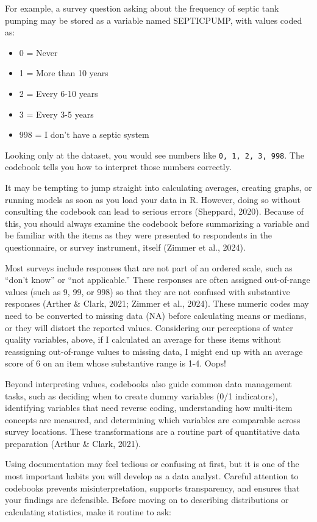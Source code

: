 \documentclass[
  letterpaper,
  DIV=11,
  numbers=noendperiod]{scrreprt}
\providecommand{\tightlist}{%
  \setlength{\itemsep}{0pt}\setlength{\parskip}{0pt}}
\begin{document}
For example, a survey question asking about the frequency of septic tank
pumping may be stored as a variable named SEPTICPUMP, with values coded
as:

\begin{itemize}
\tightlist
\item
  0 = Never
\item
  1 = More than 10 years
\item
  2 = Every 6-10 years
\item
  3 = Every 3-5 years
\item
  998 = I don't have a septic system
\end{itemize}

Looking only at the dataset, you would see numbers like
\texttt{0,\ 1,\ 2,\ 3,\ 998}. The codebook tells you how to interpret
those numbers correctly.

It may be tempting to jump straight into calculating averages, creating
graphs, or running models as soon as you load your data in R. However,
doing so without consulting the codebook can lead to serious errors
(Sheppard, 2020). Because of this, you should always examine the
codebook before summarizing a variable and be familiar with the items as
they were presented to respondents in the questionnaire, or survey
instrument, itself (Zimmer et al., 2024).

Most surveys include responses that are not part of an ordered scale,
such as ``don't know'' or ``not applicable.'' These responses are often
assigned out-of-range values (such as 9, 99, or 998) so that they are
not confused with substantive responses (Arther \& Clark, 2021; Zimmer
et al., 2024). These numeric codes may need to be converted to missing
data (NA) before calculating means or medians, or they will distort the
reported values. Considering our perceptions of water quality variables,
above, if I calculated an average for these items without reassigning
out-of-range values to missing data, I might end up with an average
score of 6 on an item whose substantive range is 1-4. Oops!

Beyond interpreting values, codebooks also guide common data management
tasks, such as deciding when to create dummy variables (0/1 indicators),
identifying variables that need reverse coding, understanding how
multi-item concepts are measured, and determining which variables are
comparable across survey locations. These transformations are a routine
part of quantitative data preparation (Arthur \& Clark, 2021).

Using documentation may feel tedious or confusing at first, but it is
one of the most important habits you will develop as a data analyst.
Careful attention to codebooks prevents misinterpretation, supports
transparency, and ensures that your findings are defensible. Before
moving on to describing distributions or calculating statistics, make it
routine to ask:
\end{document}
